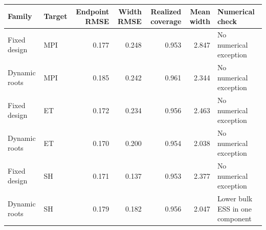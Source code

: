 \begin{tabularx}{\textwidth}{@{}llrrrr>{\raggedright\arraybackslash}X@{}}
\toprule
Family & Target & Endpoint RMSE & Width RMSE & Realized coverage & Mean width & Numerical check \\
\midrule
Fixed design & MPI & 0.177 & 0.248 & 0.953 & 2.847 & No numerical exception \\
Dynamic roots & MPI & 0.185 & 0.242 & 0.961 & 2.344 & No numerical exception \\
Fixed design & ET & 0.172 & 0.234 & 0.956 & 2.463 & No numerical exception \\
Dynamic roots & ET & 0.170 & 0.200 & 0.954 & 2.038 & No numerical exception \\
Fixed design & SH & 0.171 & 0.137 & 0.953 & 2.377 & No numerical exception \\
Dynamic roots & SH & 0.179 & 0.182 & 0.956 & 2.047 & Lower bulk ESS in one component \\
\bottomrule
\end{tabularx}
